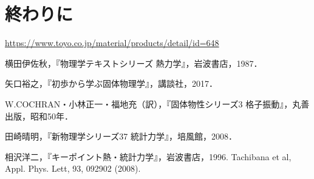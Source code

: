 \documentclass[10pt,b5paper,papersize,dvipdfmx]{jsbook}
\begin{document}
\section{終わりに}


\begin{thebibliography}{99}
   \url{https://www.toyo.co.jp/material/products/detail/id=648}
  \item 横田伊佐秋，『物理学テキストシリーズ 熱力学』，岩波書店，1987．
  \item 矢口裕之，『初歩から学ぶ固体物理学』，講談社，2017．
  \item W.COCHRAN・小林正一・福地充（訳），『固体物性シリーズ3 格子振動』，丸善出版，昭和50年．
  \item 田崎晴明，『新物理学シリーズ37 統計力学』，培風館，2008．
  \item 相沢洋二，『キーポイント熱・統計力学』，岩波書店，1996.
  Tachibana et al, Appl. Phys. Lett, 93, 092902 (2008).
\end{thebibliography}
\end{document}
